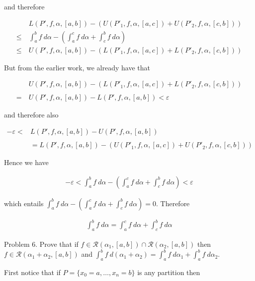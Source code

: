\documentclass{article}
\begin{document}
  and therefore

  \begin{align*}
    &L(P',f,\alpha,[a,b])-(U(P'_1,f,\alpha,[a,c])+U(P'_2,f,\alpha,[c,b])) \\
    \leq \ &\int_a^b f \ d\alpha - \left(\int_a^c f \ d\alpha +\int_c^b f \ d\alpha\right) \\
    \leq \ & U(P',f,\alpha,[a,b])-(L(P'_1,f,\alpha,[a,c])+L(P'_2,f,\alpha,[c,b]))
  \end{align*}

  But from the earlier work, we already have that

  \begin{align*}
    &U(P',f,\alpha,[a,b])-(L(P'_1,f,\alpha,[a,c])+L(P'_2,f,\alpha,[c,b])) \\\\
    = \ &U(P',f,\alpha,[a,b])-L(P',f,\alpha,[a,b]) < \varepsilon
  \end{align*}

  and therefore also

  \begin{align*}
    -\varepsilon < &L(P',f,\alpha,[a,b])-U(P',f,\alpha,[a,b]) \\\\
    &= L(P',f,\alpha,[a,b])-(U(P'_1,f,\alpha,[a,c])+U(P'_2,f,\alpha,[c,b]))
  \end{align*}

  Hence we have

  \begin{align*}
    -\varepsilon < \int_a^b f \ d\alpha - \left(\int_a^c f \ d\alpha +\int_c^b f \ d\alpha\right)<\varepsilon
  \end{align*}

  which entails $\int_a^b f \ d\alpha - \left(\int_a^c f \ d\alpha + \int_c^b f \ d\alpha\right)=0$.  Therefore

  \begin{align*}
    \int_a^b f \ d\alpha = \int_a^c f \ d\alpha + \int_c^b f \ d\alpha
  \end{align*}

  \pagebreak
  {\Large \color{Sepia} Problem 6. Prove that if $f\in\mathscr R(\alpha_1,[a,b])\cap \mathscr R(\alpha_2,[a,b])$ then $f\in \mathscr R(\alpha_1+\alpha_2,[a,b])$ and $\int_a^bf\ d(\alpha_1+\alpha_2) = \int_a^bf\ d\alpha_1+\int_a^b f\ d\alpha_2$. }

  \vspace{1cm}

  First notice that if $P=\{x_0=a,\dots,x_n=b\}$ is any partition then
\end{document}
